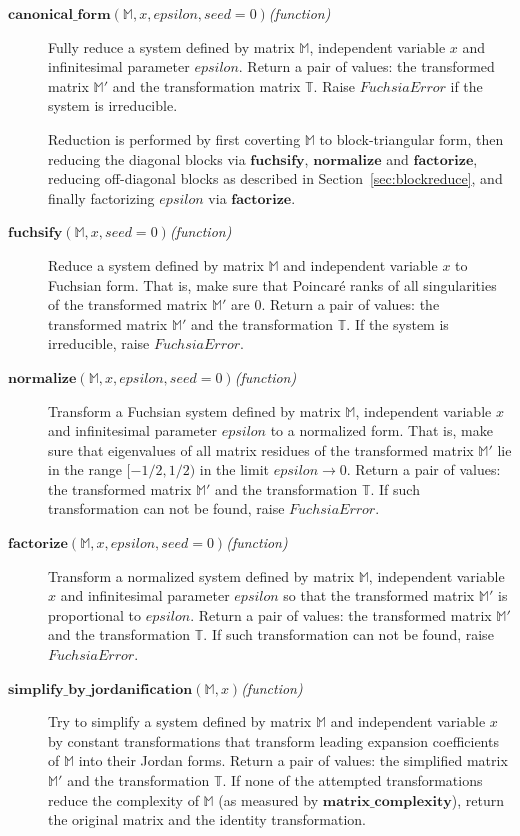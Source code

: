 \documentclass[12pt,a4paper]{article}
\def\F#1{\mathbf{#1}} %
\def\M#1{\mathbb{#1}} %
\def\functionitem#1#2{\item[$\F{#1}(#2)$\hfill\textit{(function)}]}
\begin{document}
\begin{description}

\functionitem{canonical\_form}{\M M, x, epsilon, seed=0}
Fully reduce a system defined by matrix $\M M$, independent variable $x$ and infinitesimal parameter $epsilon$.
Return a pair of values: the transformed matrix $\M M'$ and the transformation matrix $\M T$.
Raise $FuchsiaError$ if the system is irreducible.

Reduction is performed by first coverting $\M M$ to block-triangular form, then reducing the diagonal blocks via $\F{fuchsify}$, $\F{normalize}$ and $\F{factorize}$, reducing off-diagonal blocks as described in Section~\ref{sec:blockreduce}, and finally factorizing $epsilon$ via $\F{factorize}$.

\functionitem{fuchsify}{\M M, x, seed=0}
Reduce a system defined by matrix $\M M$ and independent variable $x$ to Fuchsian form.
That is, make sure that Poincar\'e ranks of all singularities of the transformed matrix $\M M'$ are $0$.
Return a pair of values: the transformed matrix $\M M'$ and the transformation $\M T$.
If the system is irreducible, raise $FuchsiaError$.

\functionitem{normalize}{\M M, x, epsilon, seed=0}
Transform a Fuchsian system defined by matrix $\M M$, independent variable $x$ and infinitesimal parameter $epsilon$ to a normalized form.
That is, make sure that eigenvalues of all matrix residues of the transformed matrix $\M M'$ lie in the range $[-1/2, 1/2)$ in the limit $epsilon\to0$.
Return a pair of values: the transformed matrix $\M M'$ and the transformation $\M T$.
If such transformation can not be found, raise $FuchsiaError$.

\functionitem{factorize}{\M M, x, epsilon, seed=0}
Transform a normalized system defined by matrix $\M M$, independent variable $x$ and infinitesimal parameter $epsilon$ so that the
transformed matrix $\M M'$ is proportional to $epsilon$.
Return a pair of values: the transformed matrix $\M M'$ and the transformation $\M T$.
If such transformation can not be found, raise $FuchsiaError$.

\functionitem{simplify\_by\_jordanification}{\M M, x}
Try to simplify a system defined by matrix $\M M$ and independent variable $x$ by constant transformations that transform leading expansion coefficients of $\M M$ into their Jordan forms.
Return a pair of values: the simplified matrix $\M M'$ and the transformation $\M T$.
If none of the attempted transformations reduce the complexity of $\M M$ (as measured by $\F{matrix\_complexity}$), return the original matrix and the identity transformation.


\end{description}
\end{document}
